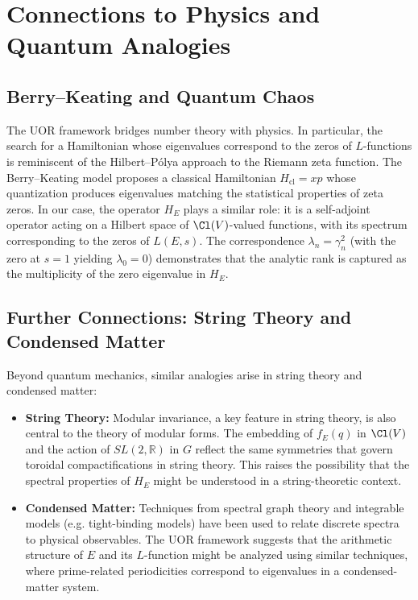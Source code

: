 \documentclass[11pt]{article}
\begin{document}
\section{Connections to Physics and Quantum Analogies}

\subsection*{Berry--Keating and Quantum Chaos}
The UOR framework bridges number theory with physics. In particular, the search for a Hamiltonian whose eigenvalues correspond to the zeros of \(L\)-functions is reminiscent of the Hilbert--Pólya approach to the Riemann zeta function. The Berry--Keating model proposes a classical Hamiltonian \(H_{\text{cl}}=xp\) whose quantization produces eigenvalues matching the statistical properties of zeta zeros. In our case, the operator \(H_E\) plays a similar role: it is a self-adjoint operator acting on a Hilbert space of \(\Cl(V)\)-valued functions, with its spectrum corresponding to the zeros of \(L(E,s)\). The correspondence \(\lambda_n = \gamma_n^2\) (with the zero at \(s=1\) yielding \(\lambda_0=0\)) demonstrates that the analytic rank is captured as the multiplicity of the zero eigenvalue in \(H_E\).

\subsection*{Further Connections: String Theory and Condensed Matter}
Beyond quantum mechanics, similar analogies arise in string theory and condensed matter:
\begin{itemize}[leftmargin=2em]
  \item \textbf{String Theory:} Modular invariance, a key feature in string theory, is also central to the theory of modular forms. The embedding of \(f_E(q)\) in \(\Cl(V)\) and the action of \(SL(2,\mathbb{R})\) in \(G\) reflect the same symmetries that govern toroidal compactifications in string theory. This raises the possibility that the spectral properties of \(H_E\) might be understood in a string-theoretic context.
  \item \textbf{Condensed Matter:} Techniques from spectral graph theory and integrable models (e.g. tight-binding models) have been used to relate discrete spectra to physical observables. The UOR framework suggests that the arithmetic structure of \(E\) and its \(L\)-function might be analyzed using similar techniques, where prime-related periodicities correspond to eigenvalues in a condensed-matter system.
\end{itemize}
\end{document}
